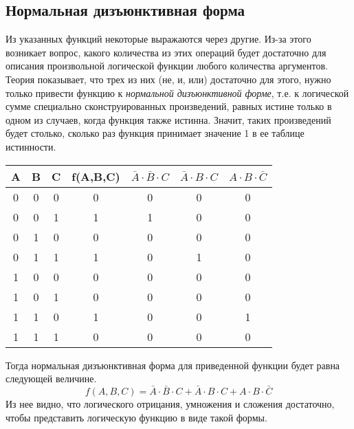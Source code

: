 
\subsection*{Нормальная дизъюнктивная форма}

Из указанных функций некоторые выражаются через другие. Из-за этого возникает вопрос, какого количества из этих операций будет достаточно для описания произвольной логической функции любого количества аргументов. Теория показывает, что трех из них (не, и, или) достаточно для этого, нужно только привести функцию к \emph{нормальной дизъюнктивной форме}, т.е. к логической сумме специально сконструированных произведений, равных истине только в одном из случаев, когда функция также истинна. Значит, таких произведений будет столько, сколько раз функция принимает значение 1 в ее таблице истинности.

\begin{tabular}{ccc|c|c|c|c}
	A&  B&  C&  f(A,B,C)&  $\bar{A}\cdot \bar{B}\cdot C$&  $\bar{A}\cdot B \cdot C$&  $A\cdot B \cdot \bar{C}$\\
	\hline
	0&  0&  0&  0&  0&  0&  0\\ 
	0&  0&  1&  1&  1&  0&  0\\ 
	0&  1&  0&  0&  0&  0&  0\\ 
	0&  1&  1&  1&  0&  1&  0\\ 
	1&  0&  0&  0&  0&  0&  0\\ 
	1&  0&  1&  0&  0&  0&  0\\ 
	1&  1&  0&  1&  0&  0&  1\\ 
	1&  1&  1&  0&  0&  0&  0\\ 
\end{tabular} 

Тогда нормальная дизъюнктивная форма для приведенной функции будет равна следующей величине.
\[f(A, B, C) = \bar{A}\cdot \bar{B}\cdot C + \bar{A}\cdot B \cdot C + A\cdot B \cdot \bar{C}\]
Из нее видно, что логического отрицания, умножения и сложения достаточно, чтобы представить логическую функцию в виде такой формы.

